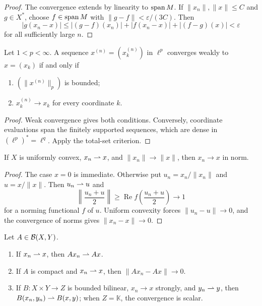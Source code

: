 \begin{proof}
The convergence extends by linearity to $\operatorname{span} M$.  If
$\|x_n\|,\|x\|\le C$ and $g\in X^*$, choose $f\in\operatorname{span} M$ with
$\|g-f\|<\varepsilon/(3C)$.  Then
\[
 |g(x_n-x)|
 \le |(g-f)(x_n)|+|f(x_n-x)|+|(f-g)(x)|<\varepsilon
\]
for all sufficiently large $n$.
\end{proof}

\begin{notetheorem}
Let $1<p<\infty$.  A sequence $x^{(n)}=(x_k^{(n)})$ in $\ell^p$ converges
weakly to $x=(x_k)$ if and only if
\begin{enumerate}
  \item $(\|x^{(n)}\|_p)$ is bounded;
  \item $x_k^{(n)}\to x_k$ for every coordinate $k$.
\end{enumerate}
\end{notetheorem}

\begin{proof}
Weak convergence gives both conditions.  Conversely, coordinate evaluations
span the finitely supported sequences, which are dense in
$(\ell^p)^*=\ell^q$.  Apply the total-set criterion.
\end{proof}

\begin{notetheorem}
If $X$ is uniformly convex, $x_n\rightharpoonup x$, and
$\|x_n\|\to\|x\|$, then $x_n\to x$ in norm.
\end{notetheorem}

\begin{proof}
The case $x=0$ is immediate.  Otherwise put
$u_n=x_n/\|x_n\|$ and $u=x/\|x\|$.  Then $u_n\rightharpoonup u$ and
\[
  \left\|\frac{u_n+u}{2}\right\|
  \ge \operatorname{Re}f\!\left(\frac{u_n+u}{2}\right)\longrightarrow1
\]
for a norming functional $f$ of $u$.  Uniform convexity forces
$\|u_n-u\|\to0$, and the convergence of norms gives $\|x_n-x\|\to0$.
\end{proof}

\begin{notetheorem}
Let $A\in\mathcal{B}(X,Y)$.
\begin{enumerate}
  \item If $x_n\rightharpoonup x$, then $Ax_n\rightharpoonup Ax$.
  \item If $A$ is compact and $x_n\rightharpoonup x$, then
        $\|Ax_n-Ax\|\to0$.
  \item If $B\colon X\times Y\to Z$ is bounded bilinear,
        $x_n\to x$ strongly, and $y_n\rightharpoonup y$, then
        $B(x_n,y_n)\rightharpoonup B(x,y)$; when $Z=\mathbb K$, the convergence is
        scalar.
\end{enumerate}
\end{notetheorem}

